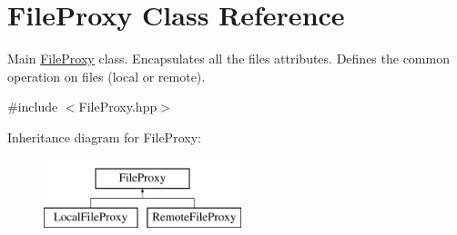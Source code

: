 \hypertarget{classFileProxy}{
\section{FileProxy Class Reference}
\label{classFileProxy}
}


Main \hyperlink{classFileProxy}{FileProxy} class. Encapsulates all the files attributes. Defines the common operation on files (local or remote).  




{\ttfamily \#include $<$FileProxy.hpp$>$}

Inheritance diagram for FileProxy:\begin{figure}[H]
\begin{center}
\leavevmode
\includegraphics[height=2.000000cm]{classFileProxy}
\end{center}
\end{figure}
